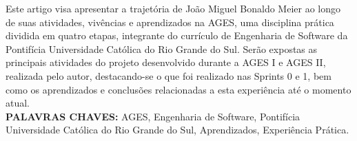 \begin{resumo}
Este artigo visa apresentar a trajetória de João Miguel Bonaldo Meier ao longo de suas atividades, vivências e aprendizados na AGES, uma disciplina prática dividida em quatro etapas, integrante do currículo de Engenharia de Software da Pontifícia Universidade Católica do Rio Grande do Sul. Serão expostas as principais atividades do projeto desenvolvido durante a AGES I e AGES II, realizada pelo autor, destacando-se o que foi realizado nas Sprints 0 e 1, bem como os aprendizados e conclusões relacionadas a esta experiência até o momento atual.
  \bigbreak\
  \\\textbf{PALAVRAS CHAVES:}
AGES, Engenharia de Software, Pontifícia Universidade Católica do Rio Grande do Sul, Aprendizados, Experiência Prática.
\end{resumo}